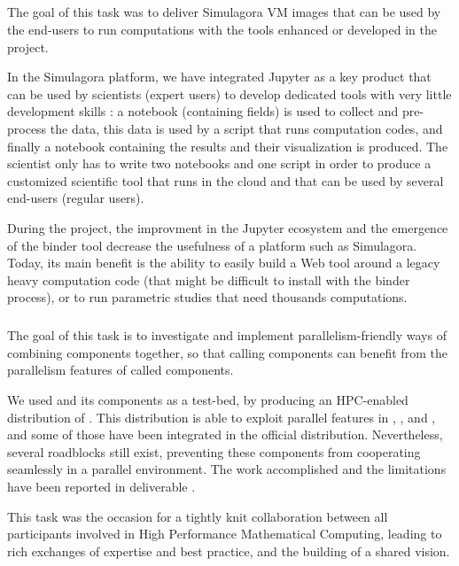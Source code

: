 
  \subparagraph{}
  \label{component-architecture@simulagora-dev}
  The goal of this task was to deliver Simulagora VM images that can be
  used by the end-users to run computations with the tools enhanced or
  developed in the project.
  
  In the Simulagora platform, we have integrated Jupyter as a key product
  that can be used by scientists (expert users) to develop dedicated tools
  with very little development skills : a notebook (containing fields) is
  used to collect and pre-process the data, this data is used by a script
  that runs computation codes, and finally a notebook containing the results
  and their visualization is produced. The scientist only has to write two
  notebooks and one script in order to produce a customized scientific tool
  that runs in the cloud and that can be used by several end-users (regular
  users).
  
  During the project, the improvment in the Jupyter ecosystem and the emergence
  of the binder tool decrease the usefulness of a platform such as Simulagora.
  Today, its main benefit is the ability to easily build a Web tool around a
  legacy heavy computation code (that might be difficult to install with
  the binder process), or to run parametric studies that need thousands
  computations.
  
  \subparagraph{}
  \label{component-architecture@component-for-HPC}
  The goal of this task is to investigate and implement
  parallelism-friendly ways of combining components together, so that
  calling components can benefit from the parallelism features of
  called components.

  We used \Sage and its components as a test-bed, by producing an
  HPC-enabled distribution of \Sage. This distribution is able to
  exploit parallel features in \Linbox, \GAP, \Singular and \PariGP,
  and some of those have been integrated in the official \Sage
  distribution. Nevertheless, several roadblocks still exist,
  preventing these components from cooperating seamlessly in a
  parallel environment. The work accomplished and the limitations have
  been reported in deliverable  
  .

  This task was the occasion for a tightly knit collaboration between
  all \ODK participants involved in High Performance Mathematical
  Computing, leading to rich exchanges of expertise and best practice,
  and the building of a shared vision.
  
